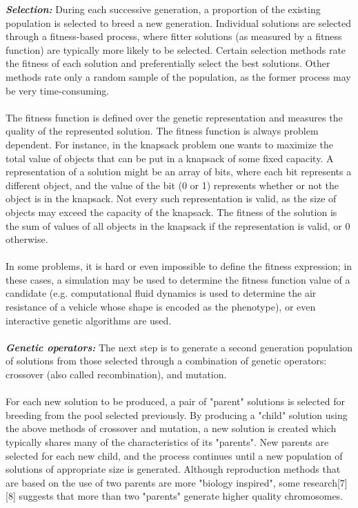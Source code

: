 \documentclass[a4paper, 12pt]{article}
\begin{document}
\textbf{\textit{Selection:}}
During each successive generation, a proportion of the existing population is selected to breed a new generation. Individual solutions are selected through a fitness-based process, where fitter solutions (as measured by a fitness function) are typically more likely to be selected. Certain selection methods rate the fitness of each solution and preferentially select the best solutions. Other methods rate only a random sample of the population, as the former process may be very time-consuming.\\~\\
\noindent
The fitness function is defined over the genetic representation and measures the quality of the represented solution. The fitness function is always problem dependent. For instance, in the knapsack problem one wants to maximize the total value of objects that can be put in a knapsack of some fixed capacity. A representation of a solution might be an array of bits, where each bit represents a different object, and the value of the bit (0 or 1) represents whether or not the object is in the knapsack. Not every such representation is valid, as the size of objects may exceed the capacity of the knapsack. The fitness of the solution is the sum of values of all objects in the knapsack if the representation is valid, or 0 otherwise.\\~\\
\noindent
In some problems, it is hard or even impossible to define the fitness expression; in these cases, a simulation may be used to determine the fitness function value of a candidate (e.g. computational fluid dynamics is used to determine the air resistance of a vehicle whose shape is encoded as the phenotype), or even interactive genetic algorithms are used.\\~\\
\textbf{\textit{Genetic operators:}}
The next step is to generate a second generation population of solutions from those selected through a combination of genetic operators: crossover (also called recombination), and mutation.\\~\\
\noindent
For each new solution to be produced, a pair of "parent" solutions is selected for breeding from the pool selected previously. By producing a "child" solution using the above methods of crossover and mutation, a new solution is created which typically shares many of the characteristics of its "parents". New parents are selected for each new child, and the process continues until a new population of solutions of appropriate size is generated. Although reproduction methods that are based on the use of two parents are more "biology inspired", some research[7][8] suggests that more than two "parents" generate higher quality chromosomes.\\~\\
\end{document}

